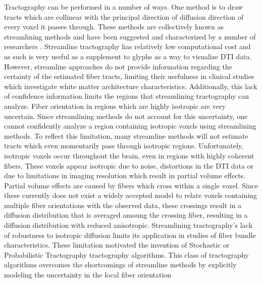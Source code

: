 Tractography can be performed in a number of ways. One method is to draw tracts which are collinear with the principal direction of diffusion direction of every voxel it passes through.  These methods are collectively known as streamlining methods and have been suggested and characterized by a number of researchers \cite{behrensMRM03}.  Streamline tractography has relatively low computational cost and as such is very useful as a supplement to glyphs as a way to visualize DTI data.  However, streamline approaches do not provide information regarding the certainty of the estimated fiber tracts, limiting their usefulness in clinical studies which investigate white matter architecture characteristics.  Additionally, this lack of confidence information limits the regions that streamlining tractography can analyze.  Fiber orientation in regions which are highly isotropic are very uncertain.  Since streamlining methods do not account for this uncertainty, one cannot confidently analyze a region containing isotropic voxels using streamlining methods.  To reflect this limitation, many streamline methods will not estimate tracts which even momentarily pass through isotropic regions.  Unfortunately, isotropic voxels occur throughout the brain, even in regions with highly coherent fibers.  These voxels appear isotropic due to noise, distortions in the DTI data or due to limitations in imaging resolution which result in partial volume effects.  Partial volume effects are caused by fibers which cross within a single voxel.  Since these currently does not exist a widely accepted model to relate voxels containing multiple fiber orientations with the observed data, these crossings result in a diffusion distribution that is averaged amoung the crossing fiber, resulting in a diffusion distribution with reduced anisotropic.  Streamlining tractography's lack of robustness to isotropic diffusion limits its application in studies of fiber bundle characteristics.  These limitation motivated the invention of Stochastic or Probabilistic Tractography tractography algorithms.  This class of tractography algorithms overcomes the shortcomings of streamline methods by explicitly modeling the uncertainty in the local fiber orientation

